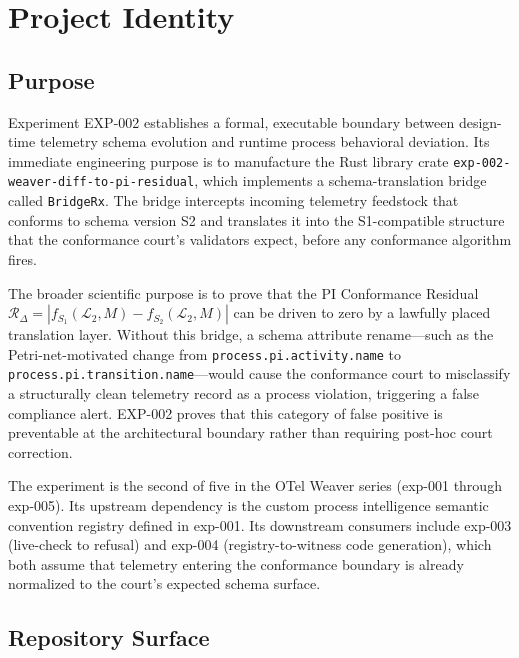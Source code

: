 
\section{Project Identity}
\label{sec:otel-weaver-exp-002-diff-to-residual-identity}

\subsection{Purpose}
\label{sec:otel-weaver-exp-002-diff-to-residual-identity-purpose}

Experiment EXP-002 establishes a formal, executable boundary between design-time
telemetry schema evolution and runtime process behavioral deviation. Its immediate
engineering purpose is to manufacture the Rust library crate
\texttt{exp-002-weaver-diff-to-pi-residual}, which implements a schema-translation
bridge called \texttt{BridgeRx}. The bridge intercepts incoming telemetry feedstock
that conforms to schema version S2 and translates it into the S1-compatible structure
that the conformance court's validators expect, before any conformance algorithm fires.

The broader scientific purpose is to prove that the PI Conformance Residual
$\mathcal{R}_{\Delta} = |f_{S_1}(\mathcal{L}_2, M) - f_{S_2}(\mathcal{L}_2, M)|$
can be driven to zero by a lawfully placed translation layer. Without this bridge, a
schema attribute rename---such as the Petri-net-motivated change from
\texttt{process.pi.activity.name} to \texttt{process.pi.transition.name}---would
cause the conformance court to misclassify a structurally clean telemetry record as a
process violation, triggering a false compliance alert. EXP-002 proves that this
category of false positive is preventable at the architectural boundary rather than
requiring post-hoc court correction.

The experiment is the second of five in the OTel Weaver series
(exp-001 through exp-005). Its upstream dependency is the custom process intelligence
semantic convention registry defined in exp-001. Its downstream consumers include
exp-003 (live-check to refusal) and exp-004 (registry-to-witness code generation),
which both assume that telemetry entering the conformance boundary is already
normalized to the court's expected schema surface.

\subsection{Repository Surface}
\label{sec:otel-weaver-exp-002-diff-to-residual-identity-repository}

